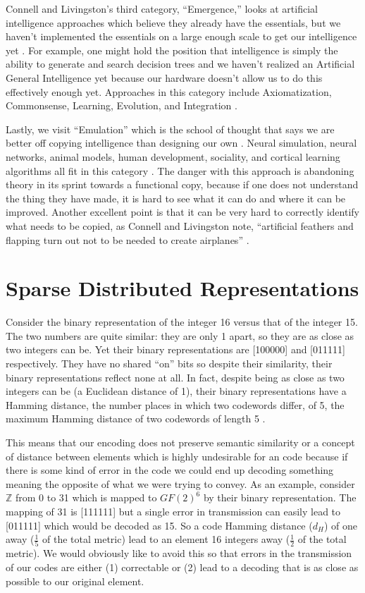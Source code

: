 \documentclass[oneside,12pt,openany]{book}
\begin{document}
	Connell and Livingston's third category, ``Emergence,'' looks at artificial intelligence approaches which believe they already have the essentials, but we haven't implemented the essentials on a large enough scale to get our intelligence yet \cite{Connell}. For example, one might hold the position that intelligence is simply the ability to generate and search decision trees and we haven't realized an Artificial General Intelligence yet because our hardware doesn't allow us to do this effectively enough yet. Approaches in this category include Axiomatization, Commonsense, Learning, Evolution, and Integration \cite{Connell}.
	
	Lastly, we visit ``Emulation'' which is the school of thought that says we are better off copying intelligence than designing our own \cite{Connell}. Neural simulation, neural networks, animal models, human development, sociality, and cortical learning algorithms all fit in this category \cite{Connell}. The danger with this approach is abandoning theory in its sprint towards a functional copy, because if one does not understand the thing they have made, it is hard to see what it can do and where it can be improved. Another excellent point is that it can be very hard to correctly identify what needs to be copied, as Connell and Livingston note, ``artificial feathers and flapping turn out not to be needed to create airplanes'' \cite{Connell}.
	
	\chapter{Sparse Distributed Representations}
	
	Consider the binary representation of the integer 16 versus that of the integer 15. The two numbers are quite similar: they are only 1 apart, so they are as close as two integers can be. Yet their binary representations are [100000] and [011111] respectively. They have no shared ``on'' bits so despite their similarity, their binary representations reflect none at all. In fact, despite being as close as two integers can be (a Euclidean distance of 1), their binary representations have a Hamming distance, the number places in which two codewords differ, of 5, the maximum Hamming distance of two codewords of length 5 \cite{Adams}. 
	
	This means that our encoding does not preserve semantic similarity or a concept of distance between elements which is highly undesirable for an code because if there is some kind of error in the code we could end up decoding something meaning the opposite of what we were trying to convey. As an example, consider $\mathbb{Z}$ from 0 to 31 which is mapped to $GF(2)^{6}$ by their binary representation. The mapping of 31 is [111111] but a single error in transmission can easily lead to [011111] which would be decoded as 15. So a code Hamming distance ($d_{H}$) of one away ($\frac{1}{5}$ of the total metric) lead to an element 16 integers away ($\frac{1}{2}$ of the total metric). We would obviously like to avoid this so that errors in the transmission of our codes are either (1) correctable or (2) lead to a decoding that is as close as possible to our original element.
	
\end{document}
